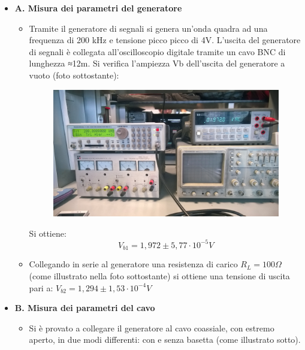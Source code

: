 \documentclass[a4paper]{article}
\begin{document}
\begin{itemize}
\item []\textbf{A. Misura dei parametri del generatore}\\
      \begin{itemize}
      \item Tramite il generatore di segnali si genera un'onda quadra ad una frequenza di 200 kHz e tensione picco picco di 4V. L'uscita del generatore di segnali è collegata all'oscilloscopio digitale tramite un cavo BNC di lunghezza ≈12m.
      Si verifica l’ampiezza Vb dell’uscita del generatore a vuoto (foto sottostante): 


\begin{figure}[h]
\centering
\includegraphics[scale=0.08]{foto/foto1.jpg}
\end{figure}

Si ottiene: \[V_{b1}=1,972 \pm 5,77\cdot10^{-5} V\]
\item Collegando in serie al generatore una resistenza di carico \(R_L=100\Omega\)  (come illustrato nella foto sottostante) si ottiene una tensione di uscita pari a: \(V_{b2}=1,294\pm1,53\cdot10^{-4} V\)
      \end{itemize}

\item []\textbf{B. Misura dei parametri del cavo}
  \begin{itemize}
    \item  Si è provato a collegare il generatore al cavo coassiale, con estremo aperto, in due modi differenti: con e senza basetta (come illustrato sotto).   


\end{itemize}
\end{itemize}
\end{document}
